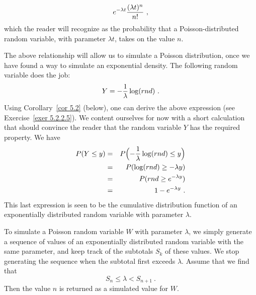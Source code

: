 $$ e^{-\lambda t}{{(\lambda t)^n}\over{n!}}\ ,$$ which the reader will recognize as
the probability that a Poisson-distributed random variable, with parameter $\lambda
t$, takes on the value $n$.
\par The above relationship will allow us to simulate a Poisson distribution, once we
have found a way to simulate an exponential density.  The following random variable
does the job:
\begin{equation} Y = -{1\over\lambda} \log(rnd)\ .\label{eq 5.9}
\end{equation} Using Corollary~\ref{cor 5.2} (below), one can derive the above
expression  (see Exercise~\ref{exer 5.2.2.5}).  We content ourselves for now with a short
calculation that should convince the reader that the random variable
$Y$ has the required property.  We have
\begin{eqnarray*} P(Y \le y) & = & P\Bigl(-{1\over\lambda} \log(rnd) \le y\Bigr) \\ &
= & P(\log(rnd)
\ge -\lambda y) \\ & = & P(rnd \ge e^{-\lambda y}) \\ & = & 1 - e^{-\lambda y}\ . \\
\end{eqnarray*} This last expression is seen to be the cumulative distribution
function of an exponentially  distributed random variable with parameter $\lambda$.
\par To simulate a Poisson random variable $W$ with parameter $\lambda$, we simply
generate a sequence  of values of an exponentially distributed random variable with
the same parameter, and keep track of the subtotals $S_k$ of these values.  We stop
generating the sequence when the subtotal first exceeds
$\lambda$.  Assume that we find that
$$S_n \le \lambda < S_{n+1}\ .$$ Then the value $n$ is returned as a simulated value
for $W$.


